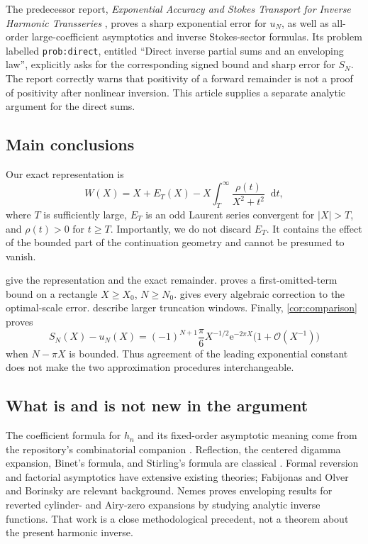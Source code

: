 \documentclass[11pt,a4paper]{article}
\theoremstyle{definition}
\numberwithin{equation}{section}
\newcommand{\dd}{\mathop{}\!\mathrm{d}}
\newcommand{\ee}{\mathrm{e}}
\newcommand{\Oh}{\mathcal O}
\begin{document}
The predecessor report, \emph{Exponential Accuracy and Stokes Transport for
Inverse Harmonic Transseries} \cite{prior}, proves a sharp exponential error
for $u_N$, as well as all-order large-coefficient asymptotics and inverse
Stokes-sector formulas. Its problem labelled \texttt{prob:direct}, entitled
``Direct inverse partial sums and an enveloping law'', explicitly asks for
the corresponding signed bound and sharp error for $S_N$. The report
correctly warns that positivity of a forward remainder is not a proof of
positivity after nonlinear inversion. This article supplies a separate
analytic argument for the direct sums.

\subsection{Main conclusions}
Our exact representation is
\begin{equation}
 W(X)=X+E_T(X)-X\int_T^\infty\frac{\rho(t)}{X^2+t^2}\dd t,
 \label{eq:intro-dispersion}
\end{equation}
where $T$ is sufficiently large, $E_T$ is an odd Laurent series convergent
for $|X|>T$, and $\rho(t)>0$ for $t\ge T$. Importantly, we do not discard
$E_T$. It contains the effect of the bounded part of the continuation
geometry and cannot be presumed to vanish.

 give the representation and the exact
remainder.  proves a first-omitted-term bound on a
rectangle $X\ge X_0$, $N\ge N_0$.  gives every algebraic
correction to the optimal-scale error.  describe
larger truncation windows. Finally, \cref{cor:comparison} proves
\begin{equation}
 S_N(X)-u_N(X)=(-1)^{N+1}\frac\pi6 X^{-1/2}\ee^{-2\pi X}
                   \bigl(1+\Oh(X^{-1})\bigr)
 \label{eq:intro-comparison}
\end{equation}
when $N-\pi X$ is bounded. Thus agreement of the leading exponential
constant does not make the two approximation procedures interchangeable.

\subsection{What is and is not new in the argument}
The coefficient formula for $h_n$ and its fixed-order asymptotic meaning
come from the repository's combinatorial companion \cite{companion}.
Reflection, the centered digamma expansion, Binet's formula, and Stirling's
formula are classical \cite{dlmf55,dlmf59,dlmf511}. Formal reversion and
factorial asymptotics have extensive existing theories; Fabijonas and Olver
\cite{fo} and Borinsky \cite{borinsky} are relevant background. Nemes
\cite{nemes} proves enveloping results for reverted cylinder- and Airy-zero
expansions by studying analytic inverse functions. That work is a close
methodological precedent, not a theorem about the present harmonic inverse.
\end{document}
